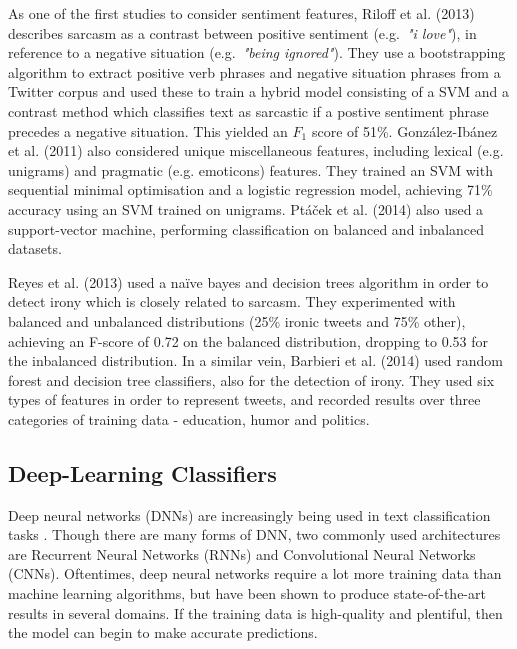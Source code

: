 \documentclass[12pt,a4paper]{article}
\begin{document}
As one of the first studies to consider sentiment features, Riloff et al. (2013) \cite{riloff2013sarcasm} describes sarcasm as a contrast between positive sentiment (e.g.\ \textit{"i love"}), in reference to a negative situation (e.g.\ \textit{"being ignored"}). They use a bootstrapping algorithm to extract positive verb phrases and negative situation phrases from a Twitter corpus and used these to train a hybrid model consisting of a SVM and a contrast method which classifies text as sarcastic if a postive sentiment phrase precedes a negative situation. This yielded an $F_1$ score of 51\%. Gonz{\'a}lez-Ib{\'a}nez et al. (2011) \cite{gonzalez2011identifying} also considered unique miscellaneous features, including lexical (e.g. unigrams) and pragmatic (e.g. emoticons) features. They trained an SVM with sequential minimal optimisation and a logistic regression model, achieving 71\% accuracy using an SVM trained on unigrams. Pt{\'a}{\v{c}ek et al. (2014)} \cite{ptavcek2014sarcasm} also used a support-vector machine, performing classification on balanced and inbalanced datasets.

Reyes et al. (2013) \cite{reyes2013multidimensional} used a na\"{i}ve bayes and decision trees algorithm in order to detect irony which is closely related to sarcasm. They experimented with balanced and unbalanced distributions (25\% ironic tweets and 75\% other), achieving an F-score of 0.72 on the balanced distribution, dropping to 0.53 for the inbalanced distribution. In a similar vein, Barbieri et al. (2014) \cite{barbieri2014modelling} used random forest and decision tree classifiers, also for the detection of irony. They used six types of features in order to represent tweets, and recorded results over three categories of training data - education, humor and politics.



\subsection{Deep-Learning Classifiers}\vspace{-10pt}
Deep neural networks (DNNs) are increasingly being used in text classification tasks \cite{zhang2015character, poria2016deeper}. Though there are many forms of DNN, two commonly used architectures are Recurrent Neural Networks (RNNs) and Convolutional Neural Networks (CNNs). Oftentimes, deep neural networks require a lot more training data than machine learning algorithms, but have been shown to produce state-of-the-art results in several domains. If the training data is high-quality and plentiful, then the model can begin to make accurate predictions. 
\end{document}
